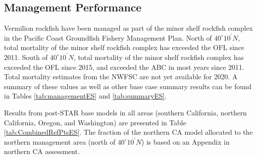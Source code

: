 \documentclass[
  english,
  a4paper,
]{article}
\begin{document}
\FloatBarrier

\hypertarget{management-performance}{%
\subsection*{Management Performance}\label{management-performance}}

Vermilion rockfish have been managed as part of the minor shelf rockfish
complex in the Pacific Coast Groundfish Fishery Management Plan. North of $40^\circ 10^\prime N$,
total mortality of the minor shelf rockfish complex has exceeded the OFL since
2011. South of $40^\circ 10^\prime N$, total mortality of the minor shelf rockfish complex has
exceeded the OFL since 2015, and exceeded the ABC in most years since 2011.
Total mortality estimates from the NWFSC are not yet available for 2020.
A summary of these values as well as other base case summary results can be found
in Tables \ref{tab:managementES} and \ref{tab:summaryES}.

Results from post-STAR base models in all areas (southern California, northern
California, Oregon, and Washington) are presented in Table \ref{tab:CombinedRefPtsES}.
The fraction of the northern CA model allocated to the northern management area
(north of $40^\circ 10^\prime N$) is based on an Appendix in northern CA assessment.
\end{document}
